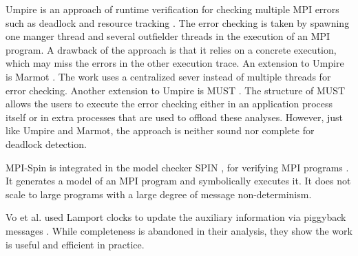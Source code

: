 Umpire is an approach of runtime verification for checking multiple MPI errors such as deadlock and resource tracking \cite{DBLP:conf/sc/VetterS00}. The error checking is taken by spawning one manger thread and several outfielder threads in the execution of an MPI program. A drawback of the approach is that it relies on a concrete execution, which may miss the errors in the other execution trace.
An extension to Umpire is Marmot \cite{DBLP:conf/parco/KrammerBMR03}. The work uses a centralized sever instead of multiple threads for error checking. Another extension to Umpire is MUST \cite{DBLP:conf/ptw/HilbrichSSM09}. The structure of MUST allows the users to execute the error checking either in an application process itself or in extra processes that are used to offload these analyses. 
However, just like Umpire and Marmot, the approach is neither sound nor complete for deadlock detection. 

MPI-Spin is integrated in the model checker SPIN \cite{DBLP:journals/tse/Holzmann97}, for verifying MPI programs \cite{DBLP:conf/vmcai/Siegel07,DBLP:conf/pvm/Siegel07}. It generates a model of an MPI program and symbolically executes it. It does not scale to large programs with a large degree of message non-determinism.

Vo et al. used Lamport clocks to update the auxiliary information via piggyback messages \cite{DBLP:conf/sc/VoAGSSB10,DBLP:conf/IEEEpact/VoGKSSB11}. While completeness is abandoned in their analysis, they show the work is useful and efficient in practice. 



